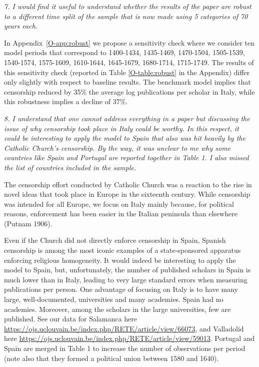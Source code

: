 \documentclass[12pt]{article}
\begin{document}
\textit{
7. I would find it useful to understand whether the results of the paper are robust to a different time split of
the sample that is now made using 5 categories of 70 years each.
}

 In Appendix~\ref{O-app:robust} we propose a sensitivity check where we consider ten model periods that correspond to 1400-1434, 1435-1469, 1470-1504, 1505-1539, 1540-1574, 1575-1609, 1610-1644, 1645-1679, 1680-1714, 1715-1749.  The results of this sensitivity check (reported in Table \ref{O-table:robust} in the Appendix) differ only slightly with respect to baseline results. The benchmark model implies that censorship reduced by 35\% the average log publications per scholar in Italy, while this robustness implies a decline of 37\%.

\textit{
8. I understand that one cannot address everything in a paper but discussing the issue of why censorship
took place in Italy could be worthy. In this respect, it could be interesting to apply the model to Spain that
also was hit heavily by the Catholic Church’s censorship. By the way, it was unclear to me why some countries
like Spain and Portugal are reported together in Table 1. I also missed the list of countries included in the
sample.
}

The censorship effort conducted by Catholic Church was a reaction to the rise in novel ideas that took place in Europe in the sixteenth century. While censorship was intended for all Europe, we focus on Italy mainly because, for political reasons, enforcement has been easier in the Italian peninsula than elsewhere (Putnam 1906). 

Even if the Church did not directly enforce censorship in Spain, Spanish censorship is among the most iconic examples of a state-sponsored apparatus enforcing religious homogeneity. It would indeed be interesting to apply the model to Spain, but, unfortunately, the number of published scholars in Spain is much lower than in Italy, leading to very large standard errors when measuring publications per person. One advantage of focusing on Italy is to have many large, well-documented, universities and many academies. Spain had no academies. Moreover, among the scholars in the large universities, few are published. See our data for Salamanca here  \url{https://ojs.uclouvain.be/index.php/RETE/article/view/66073}, and Valladolid here
\url{https://ojs.uclouvain.be/index.php/RETE/article/view/59013}. Portugal and Spain are merged in Table 1 to increase the number of observations per period (note also that they formed a political union between 1580 and 1640).
\end{document}
